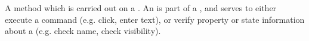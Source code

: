 \item[Action]{
A method which is carried out on a .
An  is part of a \gdstep{}, and serves to either execute a command (e.g. click, enter text), or verify property or state information about a  (e.g. check  name, check visibility).
}
